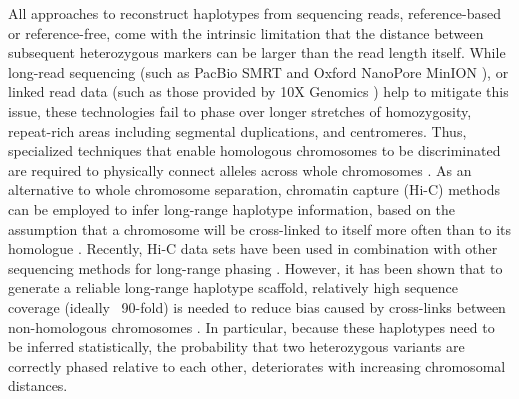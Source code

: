All approaches to reconstruct haplotypes from sequencing reads, reference-based or reference-free, come with the intrinsic limitation that the distance between subsequent heterozygous markers can be larger than the read length itself. 
While long-read sequencing (such as PacBio SMRT \citep{steinberg2014single} and Oxford NanoPore MinION \citep{ammar2015long}), or linked read data (such as those provided by 10X Genomics \citep{zheng2016haplotyping}) help to mitigate this issue, 
these technologies fail to phase over longer stretches of homozygosity, repeat-rich areas including segmental duplications, and centromeres. 
Thus, specialized techniques that enable homologous chromosomes to be discriminated are required to physically connect alleles across whole chromosomes \citep{zheng2016haplotyping, ma2010direct, yang2011completely}. 
As an alternative to whole chromosome separation, chromatin capture (Hi-C) methods \citep{lieberman2009comprehensive} can be employed to infer long-range haplotype information, based on the assumption that a chromosome will be cross-linked to itself more often than to its homologue \citep{selvaraj2013whole}.
Recently, Hi-C data sets have been used in combination with other sequencing methods for long-range phasing \citep{edge2017hapcut2, ben2016extending}. 
However, it has been shown that to generate a reliable long-range haplotype scaffold, relatively high sequence coverage (ideally ~90-fold) is needed to reduce bias caused by cross-links between non-homologous chromosomes \citep{edge2017hapcut2}. 
In particular, because these haplotypes need to be inferred statistically, the probability that two heterozygous variants are correctly phased relative to each other, deteriorates with increasing chromosomal distances.

